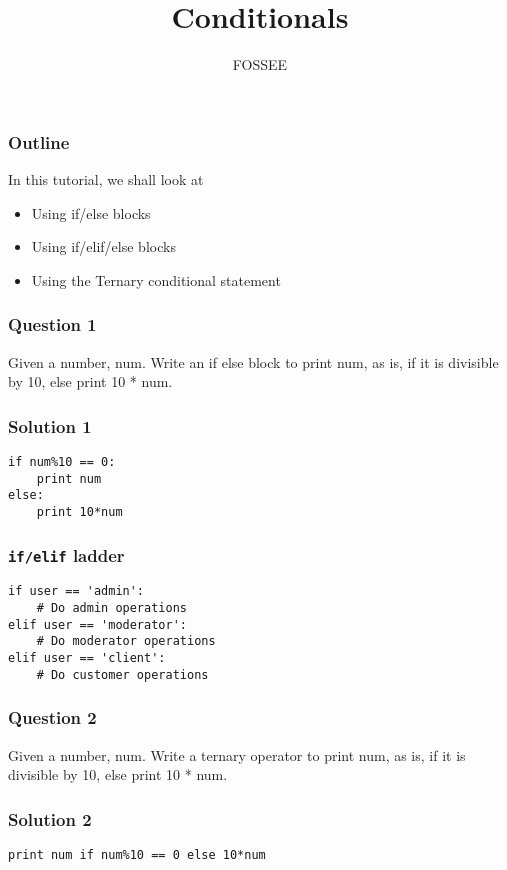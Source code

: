 \documentclass[presentation]{beamer}
\title{Conditionals}
\author{FOSSEE}
\date{}
\begin{document}
\maketitle









\begin{frame}
\frametitle{Outline}
\label{sec-1}

  In this tutorial, we shall look at
\begin{itemize}
\item Using if/else blocks
\item Using if/elif/else blocks
\item Using the Ternary conditional statement
\end{itemize}
\end{frame}
\begin{frame}
\frametitle{Question 1}
\label{sec-2}

  Given a number, num. Write an if else block to print num, as is, if
  it is divisible by 10, else print 10 * num.
\end{frame}
\begin{frame}[fragile]
\frametitle{Solution 1}
\label{sec-3}

\lstset{language=Python}
\begin{lstlisting}
if num%10 == 0: 
    print num   
else:           
    print 10*num
\end{lstlisting}
\end{frame}
\begin{frame}[fragile]
\frametitle{\texttt{if/elif} ladder}
\label{sec-4}

\lstset{language=Python}
\begin{lstlisting}
if user == 'admin':
    # Do admin operations
elif user == 'moderator':
    # Do moderator operations
elif user == 'client':
    # Do customer operations
\end{lstlisting}
\end{frame}
\begin{frame}
\frametitle{Question 2}
\label{sec-5}

  Given a number, num. Write a ternary operator to print num, as is,
  if it is divisible by 10, else print 10 * num.
\end{frame}
\begin{frame}[fragile]
\frametitle{Solution 2}
\label{sec-6}

\lstset{language=Python}
\begin{lstlisting}
print num if num%10 == 0 else 10*num
\end{lstlisting}
\end{frame}
\end{document}

